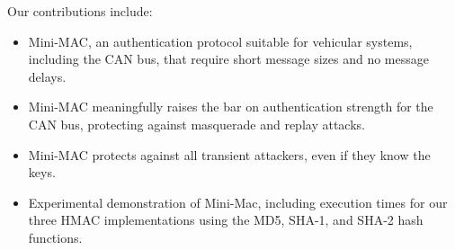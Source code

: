Our contributions include:
\begin{itemize}

\item Mini-MAC, an authentication protocol suitable for vehicular systems, including the CAN bus, 
that require short message sizes and no message delays.

\item Mini-MAC meaningfully raises the bar on authentication strength for the CAN bus, protecting against
masquerade and replay attacks.

\item Mini-MAC protects against all transient attackers, even if they know the keys.

\item Experimental demonstration of Mini-Mac, including execution times for our three HMAC
implementations using the MD5, SHA-1, and SHA-2 hash functions.

\end{itemize}